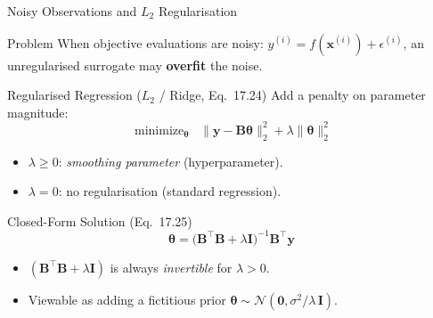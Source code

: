 \documentclass[aspectratio=169,10pt]{beamer}
\newcommand{\vx}{\mathbf{x}}
\newcommand{\vy}{\mathbf{y}}
\newcommand{\btheta}{\boldsymbol{\theta}}
\newcommand{\bB}{\mathbf{B}}
\newcommand{\bI}{\mathbf{I}}
\DeclareMathOperator*{\minimize}{minimize}
\begin{document}
\begin{frame}{Noisy Observations and $L_2$ Regularisation}
  \begin{block}{Problem}
    When objective evaluations are \alert{noisy}: $y^{(i)} = f(\vx^{(i)}) + \epsilon^{(i)}$,
    an unregularised surrogate may \textbf{overfit} the noise.
  \end{block}

  \begin{block}{Regularised Regression ($L_2$ / Ridge, Eq.\ 17.24)}
    Add a penalty on parameter magnitude:
    \[
      \minimize_{\btheta} \;\;
      \|\vy - \bB\btheta\|_2^2 + \lambda\|\btheta\|_2^2
    \]
    \begin{itemize}
      \item $\lambda \geq 0$: \emph{smoothing parameter} (hyperparameter).
      \item $\lambda = 0$: no regularisation (standard regression).
    \end{itemize}
  \end{block}

  \begin{block}{Closed-Form Solution (Eq.\ 17.25)}
    \[
      \btheta = \bigl(\bB^{\top}\bB + \lambda\bI\bigr)^{-1}\bB^{\top}\vy
    \]
    \begin{itemize}
      \item $(\bB^{\top}\bB + \lambda\bI)$ is always \emph{invertible} for $\lambda > 0$.
      \item Viewable as adding a fictitious prior $\btheta \sim \mathcal{N}(\mathbf{0}, \sigma^2/\lambda\,\bI)$.
    \end{itemize}
  \end{block}
\end{frame}
\end{document}
